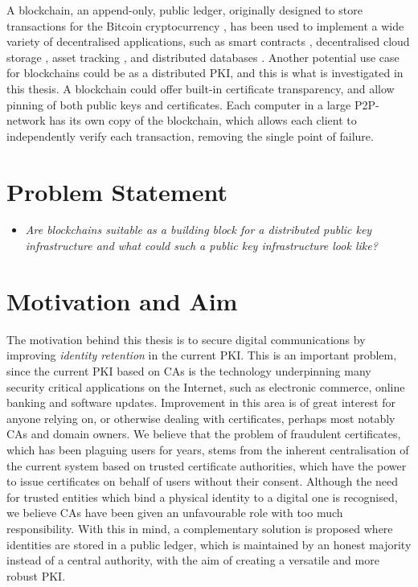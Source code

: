 \documentclass{style/kththesis}
\begin{document}
A blockchain, an append-only, public ledger, originally designed to store transactions for the Bitcoin cryptocurrency \cite{Nakamoto08}, has been used to implement a wide variety of decentralised applications, such as smart contracts \cite{Wood14}, decentralised cloud storage \cite{Wilkinson14}, asset tracking \cite{Rosenfeld12}, and distributed databases \cite{McConaghy16}. Another potential use case for blockchains could be as a distributed PKI, and this is what is investigated in this thesis. A blockchain could offer built-in certificate transparency, and allow pinning of both public keys and certificates. Each computer in a large P2P-network has its own copy of the blockchain, which allows each client to independently verify each transaction, removing the single point of failure.

\section{Problem Statement}
\begin{itemize}
    \item[~] \textit{Are blockchains suitable as a building block for a distributed public key infrastructure and what could such a public key infrastructure look like?}
\end{itemize}

\section{Motivation and Aim}
The motivation behind this thesis is to secure digital communications by improving \emph{identity retention} in the current PKI. This is an important problem, since the current PKI based on CAs is the technology underpinning many security critical applications on the Internet, such as electronic commerce, online banking and software updates. Improvement in this area is of great interest for anyone relying on, or otherwise dealing with certificates, perhaps most notably CAs and domain owners. We believe that the problem of fraudulent certificates, which has been plaguing users for years, stems from the inherent centralisation of the current system based on trusted certificate authorities, which have the power to issue certificates on behalf of users without their consent. Although the need for trusted entities which bind a physical identity to a digital one is recognised, we believe CAs have been given an unfavourable role with too much responsibility. With this in mind, a complementary solution is proposed where identities are stored in a public ledger, which is maintained by an honest majority instead of a central authority, with the aim of creating a versatile and more robust PKI.
\end{document}
